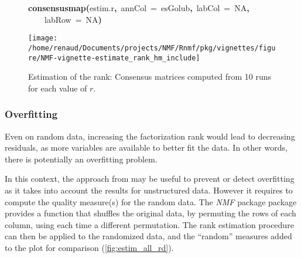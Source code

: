 \documentclass[a4paper]{article}\usepackage{graphicx, color}
\makeatletter
\def\maxwidth{ %
  \ifdim\Gin@nat@width>\linewidth
    \linewidth
  \else
    \Gin@nat@width
  \fi
}
\newcommand{\hlnumber}[1]{\textcolor[rgb]{0,0,0}{#1}}%
\newcommand{\hlfunctioncall}[1]{\textcolor[rgb]{0.501960784313725,0,0.329411764705882}{\textbf{#1}}}%
\newcommand{\hlkeyword}[1]{\textcolor[rgb]{0,0,0}{\textbf{#1}}}%
\newcommand{\hlargument}[1]{\textcolor[rgb]{0.690196078431373,0.250980392156863,0.0196078431372549}{#1}}%
\newcommand{\hlsymbol}[1]{\textcolor[rgb]{0,0,0}{#1}}%
\newcommand{\hlstd}[1]{\textcolor[rgb]{0,0,0}{#1}}%
\newenvironment{kframe}{%
 \def\FrameCommand##1{\hskip\@totalleftmargin \hskip-\fboxsep
 \colorbox{shadecolor}{##1}\hskip-\fboxsep
     \hskip-\linewidth \hskip-\@totalleftmargin \hskip\columnwidth}%
 \MakeFramed {\advance\hsize-\width
   \@totalleftmargin\z@ \linewidth\hsize
   \@setminipage}}%
 {\par\unskip\endMakeFramed}
\newenvironment{knitrout}{}{} %
\newcommand{\pkgname}[1]{\textit{#1}\xspace}
\newcommand{\Rpkg}[1]{\pkgname{#1} package\xspace}
\newcommand{\nmfpack}{\Rpkg{NMF}}
\makeatother
\begin{document}
\begin{figure}\label{fig:estim_all_hm}
\begin{knitrout}
\color{fgcolor}\begin{kframe}
\begin{flushleft}
\ttfamily\noindent
\hlfunctioncall{consensusmap}\hlkeyword{(}\hlsymbol{estim.r}\hlkeyword{,}{\ }\hlargument{annCol}{\ }\hlargument{=}{\ }\hlsymbol{esGolub}\hlkeyword{,}{\ }\hlargument{labCol}{\ }\hlargument{=}{\ }\hlnumber{NA}\hlkeyword{,}\hspace*{\fill}\\
\hlstd{}{\ }{\ }{\ }{\ }\hlargument{labRow}{\ }\hlargument{=}{\ }\hlnumber{NA}\hlkeyword{)}\mbox{}
\normalfont
\end{flushleft}
\end{kframe}\texttt{[image: /home/renaud/Documents/projects/NMF/Rnmf/pkg/vignettes/figure/NMF-vignette-estimate\_rank\_hm\_include]} 
\end{knitrout}

\caption{Estimation of the rank: Consensus matrices computed from 10 runs for each value of $r$.}
\end{figure}

\subsubsection{Overfitting}
Even on random data, increasing the factorization rank would lead to decreasing residuals, as more variables are available to better fit the data.
In other words, there is potentially an overfitting problem. 
 
In this context, the approach from \cite{Frigyesi2008} may be useful to prevent or detect overfitting as it takes into account the results for unstructured data.
However it requires to compute the quality measure(s) for the random data.
The \nmfpack package provides a function that shuffles the original data, by permuting the rows of each column, using each time a different permutation.
The rank estimation procedure can then be applied to the randomized data, and the ``random'' measures added to the plot for comparison (\cref{fig:estim_all_rd}).
\end{document}
